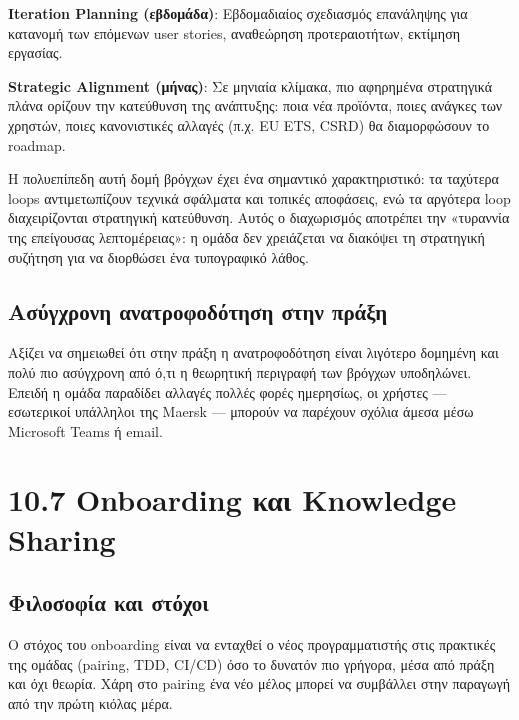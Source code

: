 \textbf{Iteration Planning (εβδομάδα)}: Εβδομαδιαίος σχεδιασμός
επανάληψης για κατανομή των επόμενων user stories, αναθεώρηση
προτεραιοτήτων, εκτίμηση εργασίας.

\textbf{Strategic Alignment (μήνας)}: Σε μηνιαία κλίμακα, πιο αφηρημένα
στρατηγικά πλάνα ορίζουν την κατεύθυνση της ανάπτυξης: ποια νέα
προϊόντα, ποιες ανάγκες των χρηστών, ποιες κανονιστικές αλλαγές (π.χ. EU
ETS, CSRD) θα διαμορφώσουν το roadmap.

Η πολυεπίπεδη αυτή δομή βρόγχων έχει ένα σημαντικό χαρακτηριστικό: τα
ταχύτερα loops αντιμετωπίζουν τεχνικά σφάλματα και τοπικές αποφάσεις,
ενώ τα αργότερα loop διαχειρίζονται στρατηγική κατεύθυνση. Αυτός ο
διαχωρισμός αποτρέπει την «τυραννία της επείγουσας λεπτομέρειας»: η
ομάδα δεν χρειάζεται να διακόψει τη στρατηγική συζήτηση για να διορθώσει
ένα τυπογραφικό λάθος.

\subsection{Ασύγχρονη ανατροφοδότηση στην
πράξη}\label{ux3b1ux3c3ux3cdux3b3ux3c7ux3c1ux3bfux3bdux3b7-ux3b1ux3bdux3b1ux3c4ux3c1ux3bfux3c6ux3bfux3b4ux3ccux3c4ux3b7ux3c3ux3b7-ux3c3ux3c4ux3b7ux3bd-ux3c0ux3c1ux3acux3beux3b7}

Αξίζει να σημειωθεί ότι στην πράξη η ανατροφοδότηση είναι λιγότερο
δομημένη και πολύ πιο ασύγχρονη από ό,τι η θεωρητική περιγραφή των
βρόγχων υποδηλώνει. Επειδή η ομάδα παραδίδει αλλαγές πολλές φορές
ημερησίως, οι χρήστες --- εσωτερικοί υπάλληλοι της Maersk --- μπορούν να
παρέχουν σχόλια άμεσα μέσω Microsoft Teams ή email.

\section{10.7 Onboarding και Knowledge
Sharing}\label{onboarding-ux3baux3b1ux3b9-knowledge-sharing}

\subsection{Φιλοσοφία και
στόχοι}\label{ux3c6ux3b9ux3bbux3bfux3c3ux3bfux3c6ux3afux3b1-ux3baux3b1ux3b9-ux3c3ux3c4ux3ccux3c7ux3bfux3b9}

Ο στόχος του onboarding είναι να ενταχθεί ο νέος προγραμματιστής στις
πρακτικές της ομάδας (pairing, TDD, CI/CD) όσο το δυνατόν πιο γρήγορα,
μέσα από πράξη και όχι θεωρία. Χάρη στο pairing ένα νέο μέλος μπορεί να
συμβάλλει στην παραγωγή από την πρώτη κιόλας μέρα.

